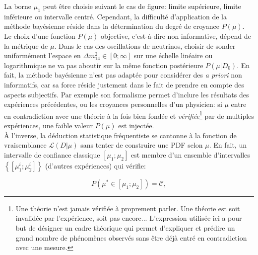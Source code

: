 La borne $\mu_1$ peut être choisie suivant le cas de figure: limite supérieure, limite inférieure ou intervalle centré. Cependant, la difficulté d'application de la méthode bayésienne réside dans la détermination du degré de croyance $P(\mu )$. Le choix d'une fonction $P(\mu )$ objective, c'est-à-dire non informative, dépend de la métrique de $\mu$. Dans le cas des oscillations de neutrinos, choisir de sonder uniformément l'espace en $\Delta m^2_{14} \in [0; \infty]$ sur une échelle linéaire ou logarithmique ne va pas aboutir sur la même fonction postérieure $P\left(\mu | D_0 \right)$. En fait, la méthode bayésienne n'est pas adaptée pour considérer des \textit{a priori} non informatifs, car sa force réside justement  dans le fait de prendre en compte des aspects subjectifs. Par exemple son formalisme permet d'inclure les résultats des expériences précédentes, ou les croyances personnelles d'un physicien: si $\mu$ entre en contradiction avec une théorie à la fois bien fondée et \textit{vérifiée}\footnote{Une théorie n'est jamais \og vérifiée \fg{} à proprement parler. Une théorie est soit invalidée par l'expérience, soit pas encore... L'expression utilisée ici a pour but de désigner un cadre théorique qui permet d'expliquer et prédire un grand nombre de phénomènes observés sans être déjà entré en contradiction avec une mesure.} par de multiples expériences, une faible valeur $P(\mu )$ est injectée.\\

À l'inverse, la déduction statistique fréquentiste se cantonne à la fonction de vraisemblance $\mathcal{L} \left(D | \mu\right)$ sans tenter de construire une PDF selon $\mu$. En fait, un intervalle de confiance classique $[\mu_1;\mu_2]$ est membre d'un ensemble d'intervalles $\left\{ [\mu_1^i;\mu_2^i] \right\}$ (d'autres expériences) qui vérifie:

\begin{equation}
\label{eq:frequentist_interpretation}
    P(\mu^* \in [\mu_1;\mu_2]) = \mathcal{C} ,
\end{equation}

\bigbreak

